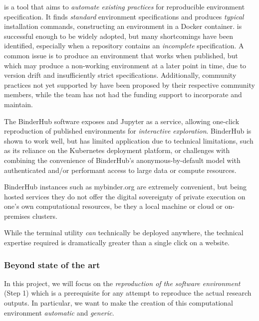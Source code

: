 \repotodocker is a tool that aims to \emph{automate existing practices} for reproducible environment specification.
It finds \emph{standard} environment specifications and produces \emph{typical} installation commands,
constructing an environment in a Docker container.
\repotodocker is successful enough to be widely adopted,
but many shortcomings have been identified,
especially when a repository contains an \emph{incomplete} specification.
A common issue is to produce an environment that works when published,
but which may produce a non-working environment at a later point in time,
due to version drift and insufficiently strict specifications.
Additionally, community practices not yet supported by \repotodocker have been proposed by their respective community members,
while the \repotodocker team has not had the funding support to incorporate and maintain.

The BinderHub software exposes \repotodocker and Jupyter as a service,
allowing one-click reproduction of published environments for \emph{interactive exploration}.
BinderHub is shown to work well,
but has limited application due to technical limitations,
such as its reliance on the Kubernetes deployment platform,
or challenges with combining the convenience of BinderHub's anonymous-by-default model
with authenticated and/or performant access to large data or compute resources.

BinderHub instances such as mybinder.org are extremely convenient,
but being hosted services they do not offer the digital sovereignty
of private execution on one's own computational resources,
be they a local machine or cloud or on-premises clusters.

While the \repotodocker terminal utility \emph{can} technically be deployed anywhere,
the technical expertise required is dramatically greater than a single click on a website.


\subsubsection{Beyond state of the art}

In this project, we will focus on the \emph{reproduction of the
software environment} (Step 1) which is a prerequisite for any attempt to
reproduce the actual research outputs. In particular, we want to make the
creation of this computational environment \emph{automatic} and \emph{generic}.

